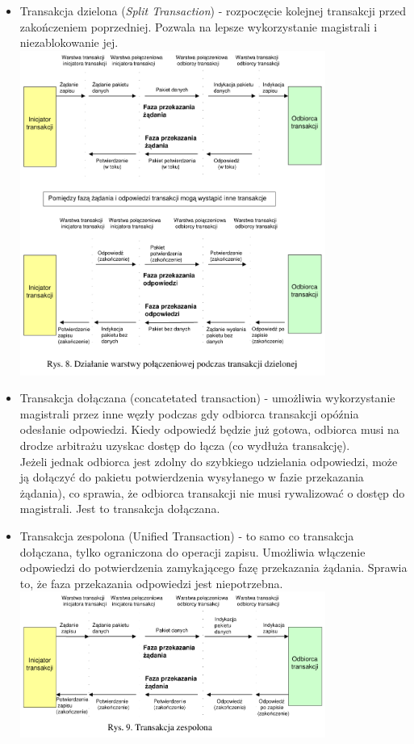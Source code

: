 	\begin{itemize}
		\item Transakcja dzielona (\emph{Split Transaction}) - rozpoczęcie kolejnej transakcji przed zakończeniem poprzedniej. Pozwala na lepsze wykorzystanie magistrali i niezablokowanie jej.\\
		\includegraphics[width=10cm]{./wyklady/FIREWIRE_10_1.pdf}
		\item Transakcja dołączana (concatetated transaction) - umożliwia wykorzystanie magistrali przez inne węzły podczas gdy odbiorca transakcji opóźnia odesłanie odpowiedzi. Kiedy odpowiedź będzie już gotowa, odbiorca musi na drodze arbitrażu uzyskac dostęp do łącza (co wydłuża transakcję).\\
		Jeżeli jednak odbiorca jest zdolny do szybkiego udzielania odpowiedzi, może ją dołączyć do pakietu potwierdzenia wysyłanego w fazie przekazania żądania), co sprawia, że odbiorca transakcji nie musi rywalizować o dostęp do magistrali. Jest to transakcja dołączana.
		\item Transakcja zespolona (Unified Transaction) - to samo co transakcja dołączana, tylko ograniczona do operacji zapisu. Umożliwia włączenie odpowiedzi do potwierdzenia zamykającego fazę przekazania żądania. Sprawia to, że faza przekazania odpowiedzi jest niepotrzebna.\\
		\includegraphics[width=10cm]{./wyklady/FIREWIRE_11_1.pdf}
	\end{itemize}
